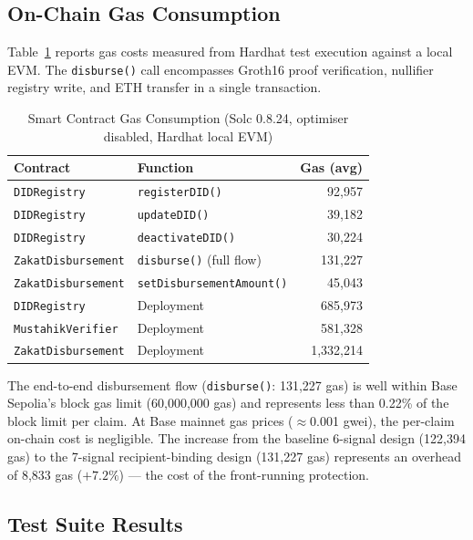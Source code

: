 \documentclass[conference]{IEEEtran}
\begin{document}
\subsection{On-Chain Gas Consumption}

Table~\ref{tab:gas} reports gas costs measured from Hardhat test execution against a local EVM. The \texttt{disburse()} call encompasses Groth16 proof verification, nullifier registry write, and ETH transfer in a single transaction.

\begin{table}[h]
\caption{Smart Contract Gas Consumption (Solc 0.8.24, optimiser disabled, Hardhat local EVM)}
\label{tab:gas}
\centering
\begin{tabularx}{\columnwidth}{p{2.8cm} X r}
\toprule
\textbf{Contract} & \textbf{Function} & \textbf{Gas (avg)} \\
\midrule
\texttt{DIDRegistry}       & \texttt{registerDID()}          & 92,957 \\
\texttt{DIDRegistry}       & \texttt{updateDID()}            & 39,182 \\
\texttt{DIDRegistry}       & \texttt{deactivateDID()}        & 30,224 \\
\texttt{ZakatDisbursement} & \texttt{disburse()} (full flow) & 131,227 \\
\texttt{ZakatDisbursement} & \texttt{setDisbursementAmount()} & 45,043 \\
\midrule
\texttt{DIDRegistry}       & Deployment                      & 685,973 \\
\texttt{MustahikVerifier}  & Deployment                      & 581,328 \\
\texttt{ZakatDisbursement} & Deployment                      & 1,332,214 \\
\bottomrule
\end{tabularx}
\end{table}

The end-to-end disbursement flow (\texttt{disburse()}: 131,227 gas) is well within Base Sepolia's block gas limit (60,000,000 gas) and represents less than 0.22\% of the block limit per claim. At Base mainnet gas prices ($\approx$0.001 gwei), the per-claim on-chain cost is negligible. The increase from the baseline 6-signal design (122,394 gas) to the 7-signal recipient-binding design (131,227 gas) represents an overhead of 8,833 gas ($+7.2\%$) — the cost of the front-running protection.

\subsection{Test Suite Results}
\end{document}
